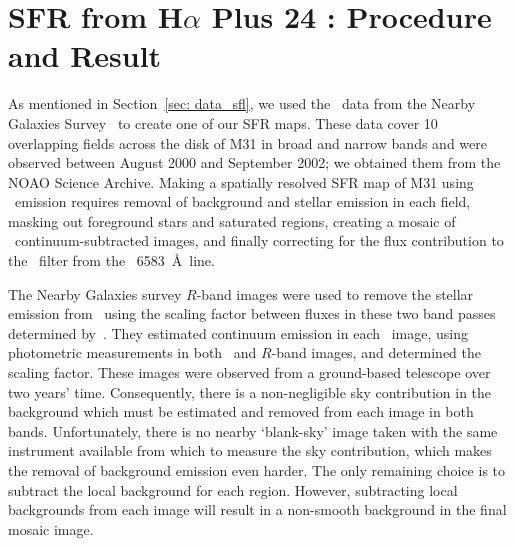 \chapter{SFR from H$\alpha$ Plus 24 \um: Procedure and Result}
\pagestyle{plain}
\label{app:halpha}
\myappendices
As mentioned in Section~\ref{sec: data_sfl}, we used the \halpha\ data from the Nearby Galaxies Survey~\citep{Massey07} to create one of our SFR maps. These data cover 10 overlapping fields across the disk of M31 in broad and narrow bands and were observed between August 2000 and September 2002; we obtained them  from the NOAO Science Archive. Making a spatially resolved SFR map of M31 using \halpha\ emission requires removal of background and stellar emission in each field, masking out foreground stars and saturated regions, creating a mosaic of \halpha\ continuum-subtracted images, and finally correcting for the flux contribution to the \halpha\ filter from the \nii\ 6583~\AA\ line.

The Nearby Galaxies survey $R$-band images were used to remove the stellar emission from \halpha\ using the scaling factor between fluxes in these two band passes determined by~\citet{Azimlu11}. They estimated continuum emission in each \halpha\ image, using photometric measurements in both \halpha\ and $R$-band images, and determined the scaling factor. These images were observed from a ground-based telescope over two years' time. Consequently, there is a non-negligible sky contribution in the background which must be estimated and removed from each image in both bands. Unfortunately, there is no nearby `blank-sky' image taken with the same instrument available from which to measure the sky contribution, which makes the removal of background emission even harder. The only remaining choice is to subtract the local background for each region. However, subtracting local backgrounds from each image will result in a non-smooth background in the final mosaic image. 


